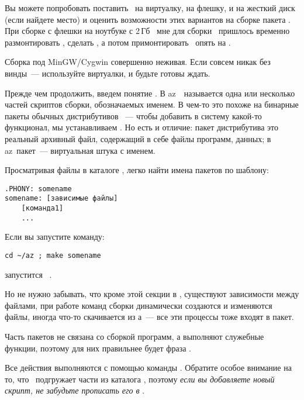 Вы можете попробовать поставить \linux\ на виртуалку, на флешку, и на жесткий
диск (если найдете место) и оценить возможности этих вариантов на сборке пакета
. При сборке с флешки на ноутбуке с 2\,Гб \ram\ мне для сборки
\ пришлось временно размонтировать , сделать
, а потом примонтировать \
опять на .

Сборка под MinGW/Cygwin совершенно неживая. Если совсем никак без винды\ ---
используйте виртуалки, и будьте готовы ждать.



Прежде чем продолжить, введем понятие . В az\linux\
\ называется одна или несколько частей скриптов сборки,
обозначаемых именем. В чем-то это похоже на бинарные пакеты обычных
дистрибутивов \linux\ --- чтобы добавить в систему какой-то функционал, мы
устанавливаем \term{бинарный пакет}.
Но есть и отличие: пакет дистрибутива это реальный архивный файл, содержащий в
себе файлы программ, данных; в az\linux\ пакет\ --- виртуальная штука с именем.

Просматривая файлы в каталоге \file{mk/}, легко найти имена пакетов по шаблону:

\begin{verbatim}
.PHONY: somename
somename: [зависимые файлы]
    [команда1]
    ...
\end{verbatim}

Если вы запустите команду:

\begin{verbatim}
cd ~/az ; make somename
\end{verbatim}

запустится \ .

Но не нужно забывать, что кроме этой секции в \file{.mk}, существуют зависимости
между файлами, при работе команд сборки динамически создаются и изменяются
файлы, иногда что-то скачивается из \internet а\ --- все эти процессы тоже
входят в пакет.

\bigskip
Часть пакетов не связана со сборкой программ, а выполняют служебные функции,
поэтому для них правильнее будет фраза .

\bigskip
Все действия выполняются с помощью команды . Обратите особое внимание
на то, что \ подгружает части из каталога , поэтому
\emph{если вы добавляете новый скрипт, не забудьте прописать его в
\file{Makefile}}.

